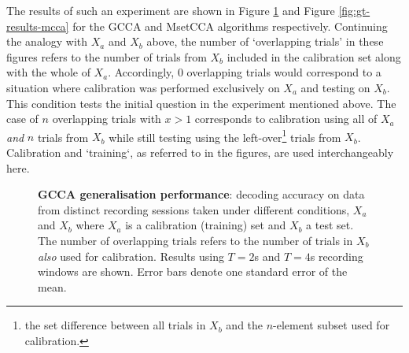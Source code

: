 The results of such an experiment are shown in Figure \ref{fig:gt-results-gcca} and Figure \ref{fig:gt-results-mcca} for the GCCA and MsetCCA algorithms respectively. Continuing the analogy with $X_a$ and $X_b$ above, the number of `overlapping trials' in these figures refers to the number of trials from $X_b$ included in the calibration set along with the whole of $X_a$. Accordingly, 0 overlapping trials would correspond to a situation where calibration was performed exclusively on $X_a$ and testing on $X_b$. This condition tests the initial question in the experiment mentioned above. The case of $n$ overlapping trials with $x>1$ corresponds to calibration using all of $X_a$ \textit{and} $n$ trials from $X_b$ while still testing using the left-over\footnote{the set difference between all trials in $X_b$ and the $n$-element subset used for calibration.} trials from $X_b$. Calibration and `training`, as referred to in the figures, are used interchangeably here.

\begin{figure}[!htb]
\hfill
{}
\caption[GCCA generalisation performance: test decoding accuracy when calibrating and testing on data collected from distinct sessions under different conditions]{\textbf{GCCA generalisation performance}: decoding accuracy on data from distinct recording sessions taken under different conditions, $X_a$ and $X_b$ where $X_a$ is a calibration (training) set and $X_b$ a test set. The number of overlapping trials refers to the number of trials in $X_b$ \textit{also} used for calibration. Results using $T=2$s and $T=4$s recording windows are shown. Error bars denote one standard error of the mean.}
\label{fig:gt-results-gcca}
\end{figure}

